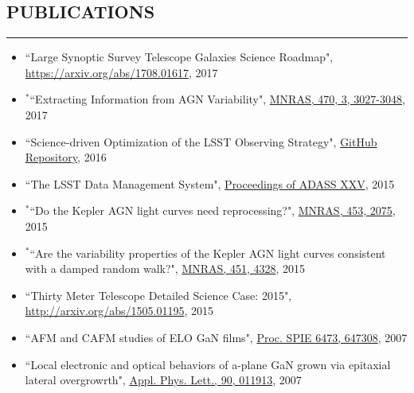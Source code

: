 \documentclass[10pt,a4]{article}
\newcounter{mySaveCounter}
\newcommand\myEnumReset{\setcounter{mySaveCounter}{0}}
\begin{document}
\subsection*{PUBLICATIONS}
\hrule  height 4pt
\vspace{0.2cm}
\begin{itemize}
	\item  ``Large Synoptic Survey Telescope Galaxies Science Roadmap", \href{https://arxiv.org/abs/1708.01617}{https://arxiv.org/abs/1708.01617}, 2017
	\item $\mathbf{^{*}}$``Extracting Information from AGN Variability", \href{https://doi.org/10.1093/mnras/stx1420}{MNRAS, 470, 3, 3027-3048}, 2017
	\item ``Science-driven Optimization of the LSST Observing Strategy", \href{https://github.com/LSSTScienceCollaborations/ObservingStrategy}{GitHub Repository}, 2016
	\item ``The LSST Data Management System", \href{http://adsabs.harvard.edu/cgi-bin/bib_query?arXiv:1512.07914}{Proceedings of ADASS XXV}, 2015
	\item $\mathbf{^{*}}$``Do the Kepler AGN light curves need reprocessing?", \href{http://dx.doi.org/10.1093/mnras/stv1797}{MNRAS, 453, 2075}, 2015
	\item $\mathbf{^{*}}$``Are the variability properties of the Kepler AGN light curves consistent with a damped random walk?", \href{http://dx.doi.org/ 10.1093/mnras/stv1230}{MNRAS, 451, 4328}, 2015
	\item  ``Thirty Meter Telescope Detailed Science Case: 2015", \href{http://arxiv.org/abs/1505.01195}{http://arxiv.org/abs/1505.01195}, 2015
	\item  ``AFM and CAFM studies of ELO GaN films", \href{http://dx.doi.org/10.1117/12.706773}{Proc. SPIE 6473, 647308}, 2007
	\item ``Local electronic and optical behaviors of a-plane GaN grown via epitaxial lateral overgrowrth", \href{http://dx.doi.org/10.1063/1.2429901}{Appl. Phys. Lett., 90, 011913}, 2007
\end{itemize}
\myEnumReset
\end{document}
